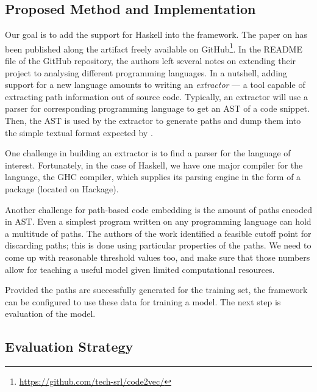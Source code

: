 \documentclass[12pt]{article}
\begin{document}
\subsection{Proposed Method and Implementation}

Our goal is to add the support for Haskell into the \cv framework.
%
The paper on \cv has been published along the artifact freely available on GitHub\footnote{
\url{https://github.com/tech-srl/code2vec/}}. In
the README file of the GitHub repository, the authors left several notes on extending 
their project to analysing different programming languages. In a nutshell, adding 
support for a new language amounts to writing an \emph{extractor} — a tool capable of 
extracting path information out of source code. Typically, an extractor will use a parser
for corresponding programming language to get an AST of a code snippet. 
Then, the AST is used by the extractor to generate paths and dump them into the simple textual 
format expected by \cv.

One challenge in building an extractor is to find a parser for the language of interest.
Fortunately, in the case of Haskell, we have one major compiler for the language, the GHC compiler, 
which supplies its parsing engine in the form of a package (located on Hackage).

Another challenge for path-based code embedding is the amount of paths encoded in AST.
Even a simplest program written on any programming language can hold a multitude of paths. 
The authors of the \cv work 
identified a feasible cutoff point for discarding paths; this is done using
particular properties of the paths.
We need to come up with reasonable threshold values too, and 
make sure that those numbers allow for teaching a useful model given limited computational resources.

Provided the paths are successfully generated for the training set,
the \cv framework can be configured to use these data for training a model.
The next step is evaluation of the model.

\subsection{Evaluation Strategy}
\end{document}
